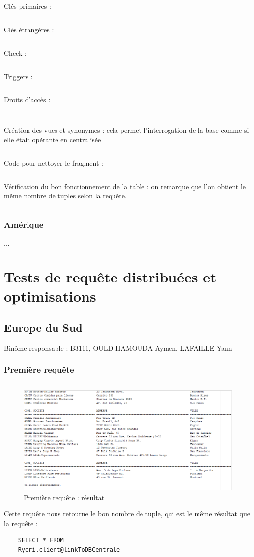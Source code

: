 \documentclass[10pt,a4paper]{article}
\theoremstyle{plain}
\begin{document}
Clés primaires : 
\inputminted{sql}{EUS_III-C-5-Primary_key.sql}
\newpage

Clés étrangères :
\inputminted{sql}{EUS_III-C-5_foreign_key.sql}
\newpage

Check :
\inputminted{sql}{EUS_III-C-5_check.sql}
\newpage

Triggers : 
\inputminted{sql}{EUS_III-C-5_trigger.sql}
\newpage

Droits d'accès : 
\inputminted{sql}{EUS_III-C-6.sql}
\inputminted{sql}{EUS_III-C-6_2.sql}
\newpage

Création des vues et synonymes : cela permet l'interrogation de la base comme si elle était opérante en centralisée

\inputminted{sql}{EUS_III-C-7.sql}
\newpage

Code pour nettoyer le fragment :
\inputminted{sql}{EUS_III-C-8.sql}
\newpage

Vérification du bon fonctionnement de la table : on remarque que l'on obtient le même nombre de tuples selon la requête.
\inputminted{sql}{EUS_III-C-9.sql}
\newpage 

\subsubsection{Amérique}

...
\newpage

\section{Tests de requête distribuées et optimisations}
\subsection{Europe du Sud}
Binôme responsable : B3111, OULD HAMOUDA Aymen, LAFAILLE Yann

\subsubsection{Première requête}
\inputminted{sql}{EUS_IV-A-1.sql}
\begin{figure}[H]
    \centering
    \includegraphics[width=15cm]{EUS_req1.PNG}
    \caption{Première requête : résultat}
\end{figure}
Cette requête nous retourne le bon nombre de tuple, qui est le même résultat que la requête :
\begin{verbatim}
    SELECT * FROM
    Ryori.client@linkToDBCentrale
\end{verbatim}
\end{document}

